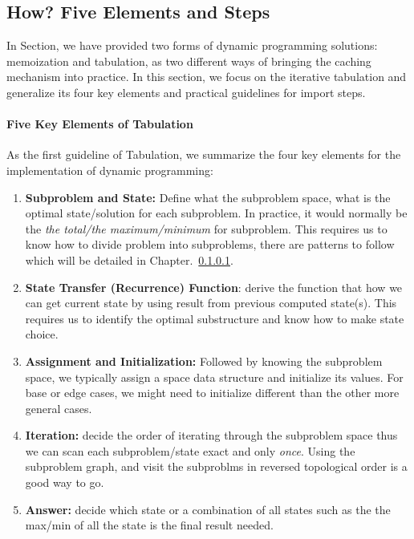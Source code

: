 \documentclass[../main.tex]{subfiles}
\begin{document}
\subsection{How? Five Elements and Steps}
\label{sec_dp_elements}
In Section, we have provided two forms of dynamic programming solutions: memoization and tabulation, as two different ways of bringing the caching mechanism into practice. In this section, we focus on the iterative tabulation and generalize its four key elements and practical guidelines for import steps.

\paragraph{Five Key Elements of Tabulation}
As the first guideline of Tabulation, we summarize the four key elements  for the implementation of dynamic programming:
\begin{enumerate}
    \item \textbf{Subproblem and State:} Define what the subproblem space, what is the optimal state/solution for each subproblem. In practice, it would normally be the  \textit{the total/the maximum/minimum} for subproblem.  This requires us to know how to divide problem into subproblems, there are patterns to follow which will be detailed in Chapter.~\ref{}. 
    \item \textbf{State Transfer (Recurrence) Function}: derive the function that how we can get current state by using result from previous computed state(s). This requires us to identify the optimal substructure and  know how to make state choice.
    \item \textbf{Assignment and Initialization:} Followed by knowing the subproblem space, we typically assign a space data structure and initialize its values. For base or edge cases, we might need to initialize different than the other more general cases. 
    \item \textbf{Iteration:} decide the order of iterating through the subproblem space thus we can scan each subproblem/state exact and only \textit{once}. Using the subproblem graph, and visit the subproblms in reversed topological order is a good way to go.
    \item \textbf{Answer:} decide which state or a combination of all states such as the  the max/min of all the state is the final result needed. 
\end{enumerate}
\end{document}
